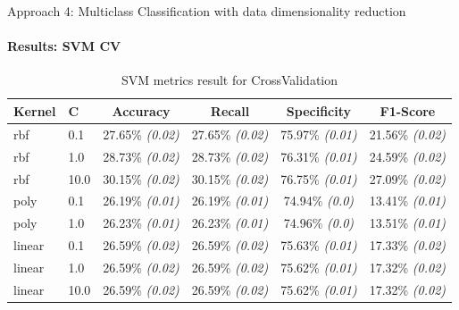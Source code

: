 \documentclass[9pt, pstricks, xcolor=dvipsnames]{beamer}
\begin{document}
\begin{frame}{Approach 4: Multiclass Classification with data dimensionality reduction}
\framesubtitle{Results: SVM CV}
\begin{table}[H]
\centering
\begin{tabular}{llcccc}
\toprule
Kernel & C & Accuracy & Recall & Specificity & F1-Score \\
\midrule
rbf & 0.1 & 27.65\% \textit{(0.02)} & 27.65\% \textit{(0.02)} & 75.97\% \textit{(0.01)} & 21.56\% \textit{(0.02)} \\
rbf & 1.0 & 28.73\% \textit{(0.02)} & 28.73\% \textit{(0.02)} & 76.31\% \textit{(0.01)} & 24.59\% \textit{(0.02)} \\
rbf & 10.0 & 30.15\% \textit{(0.02)} & 30.15\% \textit{(0.02)} & 76.75\% \textit{(0.01)} & 27.09\% \textit{(0.02)} \\
poly & 0.1 & 26.19\% \textit{(0.01)} & 26.19\% \textit{(0.01)} & 74.94\% \textit{(0.0)} & 13.41\% \textit{(0.01)} \\
poly & 1.0 & 26.23\% \textit{(0.01)} & 26.23\% \textit{(0.01)} & 74.96\% \textit{(0.0)} & 13.51\% \textit{(0.01)} \\
linear & 0.1 & 26.59\% \textit{(0.02)} & 26.59\% \textit{(0.02)} & 75.63\% \textit{(0.01)} & 17.33\% \textit{(0.02)} \\
linear & 1.0 & 26.59\% \textit{(0.02)} & 26.59\% \textit{(0.02)} & 75.62\% \textit{(0.01)} & 17.32\% \textit{(0.02)} \\
linear & 10.0 & 26.59\% \textit{(0.02)} & 26.59\% \textit{(0.02)} & 75.62\% \textit{(0.01)} & 17.32\% \textit{(0.02)} \\
\bottomrule
\end{tabular}
\caption{SVM metrics result for CrossValidation}
\label{tab:SVM_CV_approach4}
\end{table}
\end{frame}
\end{document}
